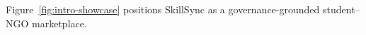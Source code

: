 \documentclass[12pt,a4paper]{article}
\begin{document}
Figure~\ref{fig:intro-showcase} positions SkillSync as a governance-grounded student--NGO marketplace.












\newpage


\end{document}
